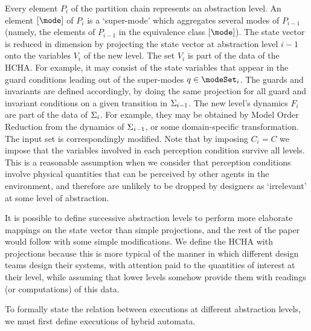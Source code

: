 Every element $P_i$ of the partition chain represents an abstraction level. 
An element $[\mode]$ of $P_i$ is a `super-mode' which aggregates several modes of $P_{i-1}$ (namely, the elements of $P_{i-1}$ in the equivalence class $[\mode]$).
The state vector is reduced in dimension by projecting the state vector at abstraction level $i-1$ onto the variables $V_i$ of the new level. 
The set $V_i$ is part of the data of the HCHA.
For example, it may consist of the state variables that appear in the guard conditions leading out of the super-modes $q \in \modeSet_i$.
The guards and invariants are defined accordingly, by doing the same projection for all guard and invariant conditions on a given transition in $\Sigma_{i-1}$.
The new level's dynamics $F_i$ are part of the data of $\Sigma_i$. 
For example, they may be obtained by Model Order Reduction from the dynamics of $\Sigma_{i-1}$, or some domain-specific transformation.
The input set is correspondingly modified.
Note that by imposing $C_i=C$ we impose that the variables involved in each perception condition survive all levels.
This is a reasonable assumption when we consider that perception conditions involve physical quantities that can be perceived by other agents in the environment, and therefore are unlikely to be dropped by designers as `irrelevant' at some level of abstraction. 
\begin{rem}
	It is possible to define successive abstraction levels to perform more elaborate mappings on the state vector than simple projections, and the rest of the paper would follow with some simple modifications. 
		We define the HCHA with projections because this is more typical of the manner in which different design teams design their systems, with attention paid to the quantities of interest at their level, while assuming that lower levels somehow provide them with readings (or computations) of this data.
\end{rem}



To formally state the relation between executions at different abstraction levels, we must first define executions of hybrid automata. 